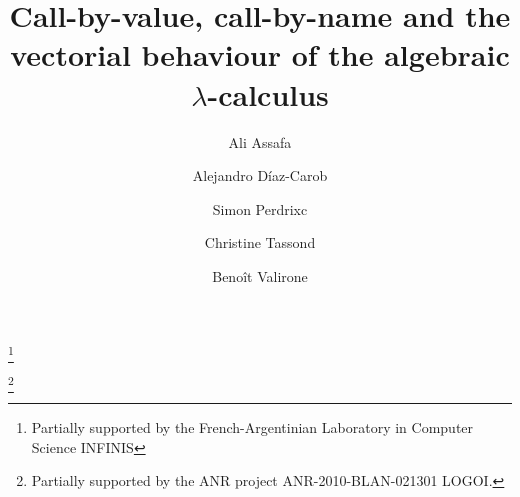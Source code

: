 \documentclass{LMCS}
\begin{document}
\title[CbV, CbN and the vectorial behaviour of the algebraic $\lambda$-calculus]{Call-by-value, call-by-name and the vectorial behaviour of the algebraic $\lambda$-calculus}

\author[A.~Assaf]{Ali Assaf\rsuper a}
\address{{}\'Ecole Polytechnique\\
Route de Saclay\\
91120 Palaiseau\\
France}
\address{{}INRIA\\
23 avenue d'Italie\\
CS 81321\\
75214 Paris Cedex 13\\
France}

\author[A.~D\'iaz-Caro]{Alejandro D\'iaz-Caro\rsuper b}
\address{{\lsuper b}Universidad Nacional de Quilmes\\
Roque S\'aenz Pe\~na 352\\
1876 Bernal, Buenos Aires\\
Argentina}
\thanks{ Partially supported by the French-Argentinian Laboratory in Computer Science INFINIS}

\author[S.~Perdrix]{Simon Perdrix\rsuper c}
\address{{\lsuper c}CNRS \& LORIA\\
615, rue du Jardin Botanique\\
BP-101\\
54602 Villers-l\`es-Nancy\\
France}

\author[C.~Tasson]{Christine Tasson\rsuper d}
\address{{}PPS, Universit\'e Paris-Diderot -- Paris 7\\
CNRS UMR 7126\\
75205 Paris Cedex 13\\
France}

\author[B.~Valiron]{Beno\^it Valiron\rsuper e}
\address{{} I2M, Universit\'{e} Aix-Marseille,\\
CNRS UMR 7373, 
Campus de Luminy, case 907, F–13288 Marseille\\
France}
\thanks{{} Partially supported by the ANR project ANR-2010-BLAN-021301 LOGOI.}

\end{document}
